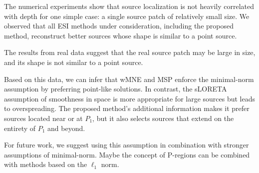 The numerical experiments show that source localization is not heavily correlated with depth for one simple case: a single source patch of relatively small size.
%
We observed that all ESI methods under consideration, including the proposed method, reconstruct better sources whose shape is similar to a point source.

The results from real data suggest that the real source patch may be large in size, and its shape is not similar to a point source.

Based on this data, we can infer that wMNE and MSP enforce the minimal-norm assumption by preferring point-like solutions. In contrast, the sLORETA assumption of smoothness in space is more appropriate for large sources but leads to overspreading.
%
The proposed method's additional information makes it prefer sources located near or at $P_1$, but it also selects sources that extend on the entirety of $P_1$ and beyond.

For future work, we suggest using this assumption in combination with stronger assumptions of minimal-norm. 
%
Maybe the concept of P-regions can be combined with methods based on the $\ell_1$ norm.